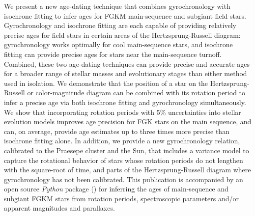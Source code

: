 We present a new age-dating technique that combines gyrochronology with
isochrone fitting to infer ages for FGKM main-sequence and subgiant field
stars.
Gyrochronology and isochrone fitting are each capable of providing relatively
    precise ages for field stars in certain areas of the Hertzsprung-Russell
    diagram: gyrochronology works optimally for cool main-sequence stars, and
    isochrone fitting can provide precise ages for stars near the
    main-sequence turnoff.
Combined, these two age-dating techniques can provide precise and accurate
ages for a broader range of stellar masses and evolutionary stages than either
method used in isolation.
We demonstrate that the position of a star on the Hertzsprung-Russell or
color-magnitude diagram can be combined with its rotation period to infer a
precise age via both isochrone fitting and gyrochronology simultaneously.
We show that incorporating rotation periods with 5\% uncertainties into
    stellar evolution models improves age precision for FGK stars on the main
    sequence, and can, on average, provide age estimates up to three times
    more precise than isochrone fitting alone.
In addition, we provide a new gyrochronology relation, calibrated to the
Praesepe cluster and the Sun, that includes a variance model to capture the
rotational behavior of stars whose rotation periods do not lengthen with the
square-root of time, and parts of the Hertzsprung-Russell diagram where
gyrochronology has not been calibrated.
This publication is accompanied by an open source {\it Python} package (\sd)
for inferring the ages of main-sequence and subgiant FGKM stars from rotation
periods, spectroscopic parameters and/or apparent magnitudes and parallaxes.
